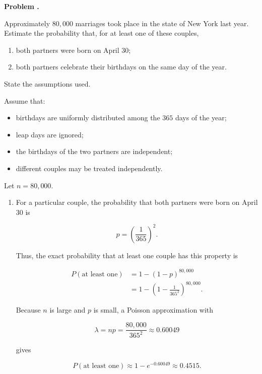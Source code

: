 \documentclass[11pt]{article}
\newcounter{problem}
\newenvironment{problem}[1][]{
    \refstepcounter{problem}
    \begin{problemheader}
        \textbf{Problem \theproblem%
        \if\relax\detokenize{#1}\relax
        \else. #1%
        \fi}
    \end{problemheader}
}{
    \vspace{0.5em}
}
\newenvironment{solution}{
    \par
    \begin{tcolorbox}[
        colback=white,
        colframe=uwgold,
        boxrule=0.7pt,
        arc=2mm,
        left=3mm,
        right=3mm,
        top=2mm,
        bottom=2mm,
        breakable,
        before skip=0.5em,
        after skip=1em,
        title=\textbf{Solution},
        coltitle=uwpurple,
        fonttitle=\bfseries
    ]
}{
    \end{tcolorbox}
}
\begin{document}
   \newpage \begin{problem}

Approximately \(80{,}000\) marriages took place in the state of New York
last year. Estimate the probability that, for at least one of these
couples,

\begin{enumerate}[label=(\alph*)]
    \item both partners were born on April 30;
    \item both partners celebrate their birthdays on the same day of the
    year.
\end{enumerate}

State the assumptions used.
\end{problem}
\begin{solution}

Assume that:

\begin{itemize}
    \item birthdays are uniformly distributed among the \(365\) days of
    the year;
    \item leap days are ignored;
    \item the birthdays of the two partners are independent;
    \item different couples may be treated independently.
\end{itemize}

Let \(n=80{,}000\).

\begin{enumerate}[label=(\alph*)]

\item For a particular couple, the probability that both partners were
born on April 30 is

\[
p=\left(\frac{1}{365}\right)^2.
\]

Thus, the exact probability that at least one couple has this property is

\[
\begin{aligned}
P(\text{at least one})
&=
1-(1-p)^{80{,}000}\\
&=
1-\left(1-\frac{1}{365^2}\right)^{80{,}000}.
\end{aligned}
\]

Because \(n\) is large and \(p\) is small, a Poisson approximation with

\[
\lambda=np
=
\frac{80{,}000}{365^2}
\approx0.60049
\]

gives

\[
P(\text{at least one})
\approx
1-e^{-0.60049}
\approx
 {0.4515}.
\]


\end{enumerate}
\end{solution}
\end{document}

